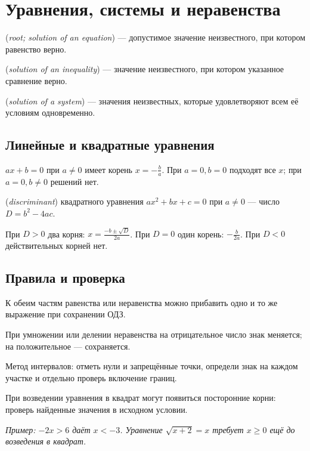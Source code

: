\chapter{Уравнения, системы и неравенства}\label{chap:c11}
\begin{definition} (\emph{root; solution of an equation}) — допустимое значение неизвестного, при котором равенство верно.\end{definition}
\begin{definition} (\emph{solution of an inequality}) — значение неизвестного, при котором указанное сравнение верно.\end{definition}
\begin{definition} (\emph{solution of a system}) — значения неизвестных, которые удовлетворяют всем её условиям одновременно.\end{definition}
\section{Линейные и квадратные уравнения}
\(ax + b = 0\) при \(a \ne  0\) имеет корень \(x = - \frac{b}{a}\). При \(a = 0,\allowbreak b = 0\) подходят все \(x\); при \(a = 0,\allowbreak b \ne  0\) решений нет.\par
\begin{definition} (\emph{discriminant}) квадратного уравнения \(ax^{2}+bx+c=0\) при \(a\ne0\) — число \(D=b^{2}-4ac\).\end{definition}
При \(D > 0\) два корня: \(x = \frac{- b \pm  \sqrt{D}}{2 a}\). При \(D = 0\) один корень: \(- \frac{b}{2 a}\). При \(D < 0\) действительных корней нет.\par
\section{Правила и проверка}
К обеим частям равенства или неравенства можно прибавить одно и то же выражение при сохранении ОДЗ.\par
При умножении или делении неравенства на отрицательное число знак меняется; на положительное — сохраняется.\par
Метод интервалов: отметь нули и запрещённые точки, определи знак на каждом участке и отдельно проверь включение границ.\par
При возведении уравнения в квадрат могут появиться посторонние корни: проверь найденные значения в исходном условии.\par
{\small\textit{Пример: \(- 2 x > 6\) даёт \(x < - 3\). Уравнение \(\sqrt{x + 2} = x\) требует \(x \ge  0\) ещё до возведения в квадрат.}}\par

